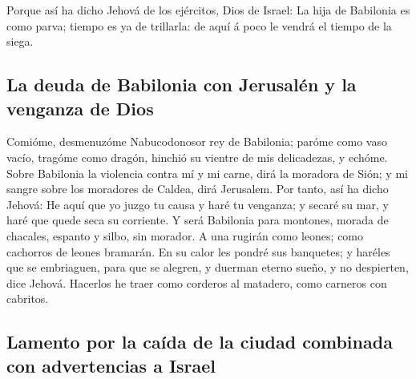  Porque así ha dicho Jehová de los ejércitos, Dios de
Israel: La hija de Babilonia es como parva; tiempo es ya de trillarla:
de aquí á poco le vendrá el tiempo de la siega.

\hypertarget{la-deuda-de-babilonia-con-jerusaluxe9n-y-la-venganza-de-dios}{%
\subsection{La deuda de Babilonia con Jerusalén y la venganza de
Dios}\label{la-deuda-de-babilonia-con-jerusaluxe9n-y-la-venganza-de-dios}}

 Comióme, desmenuzóme Nabucodonosor rey de Babilonia;
paróme como vaso vacío, tragóme como dragón, hinchió su vientre de mis
delicadezas, y echóme.  Sobre Babilonia la violencia
contra mí y mi carne, dirá la moradora de Sión; y mi sangre sobre los
moradores de Caldea, dirá Jerusalem.  Por tanto, así ha
dicho Jehová: He aquí que yo juzgo tu causa y haré tu venganza; y secaré
su mar, y haré que quede seca su corriente.  Y será
Babilonia para montones, morada de chacales, espanto y silbo, sin
morador.  A una rugirán como leones; como cachorros de
leones bramarán.  En su calor les pondré sus banquetes; y
haréles que se embriaguen, para que se alegren, y duerman eterno sueño,
y no despierten, dice Jehová.  Hacerlos he traer como
corderos al matadero, como carneros con cabritos.

\hypertarget{lamento-por-la-cauxedda-de-la-ciudad-combinada-con-advertencias-a-israel}{%
\subsection{Lamento por la caída de la ciudad combinada con advertencias
a
Israel}\label{lamento-por-la-cauxedda-de-la-ciudad-combinada-con-advertencias-a-israel}}

